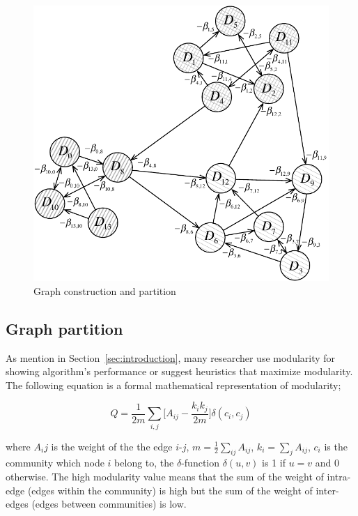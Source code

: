 \documentclass{article}
\begin{document}
\begin{figure} [h]
  \centering
  \includegraphics[width=.9\linewidth]{figs/graphConPartition}
  \caption{Graph construction and partition}
  \label{fig:graphConPartition}
\end{figure}


\subsection{Graph partition} \label{sec:graphPartition}

As mention in Section~\ref{sec:introduction}, many researcher use modularity for showing algorithm's performance or suggest heuristics that maximize modularity. The following equation is a formal mathematical representation of modularity;


\begin{equation} \label{eq:modularity}
	Q= \frac{1}{2m} \sum_{i,j} \Big[A_{ij} - \frac{k_{i}k_{j}}{2m}\Big] \delta(c_{i},c_{j})
\end{equation}

\noindent where $A_ij$ is the weight of the the edge $i$-$j$, $m=\frac{1}{2} \sum_{ij}A_{ij}$, $k_{i}=\sum_{j}A_{ij}$, $c_i$ is the community which node $i$ belong to, the $\delta$-function $\delta(u,v)$ is 1 if $u=v$ and 0 otherwise. The high modularity value means that the sum of the weight of intra-edge (edges within the community) is high but the sum of the weight of inter-edges (edges between communities) is low.
\end{document}
